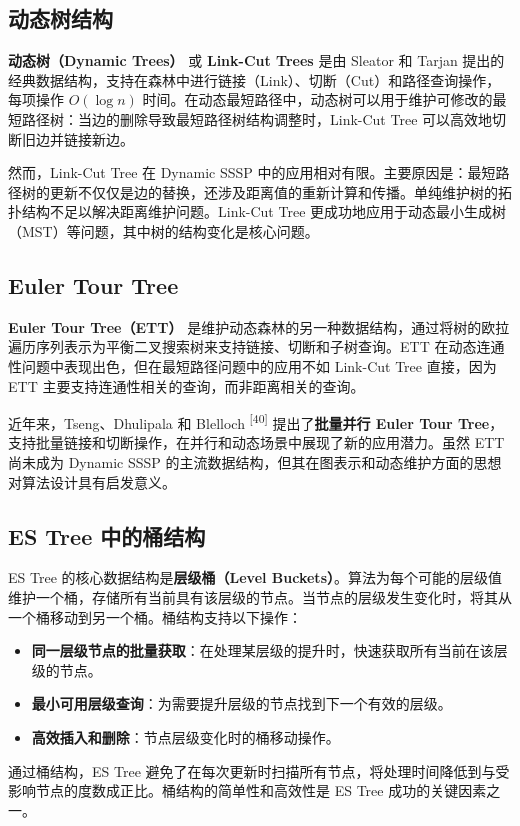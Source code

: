 \documentclass[12pt,a4paper]{ctexart}
\begin{document}
\subsection{动态树结构}

\textbf{动态树（Dynamic Trees）} 或 \textbf{Link-Cut Trees} 是由 Sleator 和 Tarjan 提出的经典数据结构，支持在森林中进行链接（Link）、切断（Cut）和路径查询操作，每项操作 $O(\log n)$ 时间。在动态最短路径中，动态树可以用于维护可修改的最短路径树：当边的删除导致最短路径树结构调整时，Link-Cut Tree 可以高效地切断旧边并链接新边。

然而，Link-Cut Tree 在 Dynamic SSSP 中的应用相对有限。主要原因是：最短路径树的更新不仅仅是边的替换，还涉及距离值的重新计算和传播。单纯维护树的拓扑结构不足以解决距离维护问题。Link-Cut Tree 更成功地应用于动态最小生成树（MST）等问题，其中树的结构变化是核心问题。

\subsection{Euler Tour Tree}

\textbf{Euler Tour Tree（ETT）} 是维护动态森林的另一种数据结构，通过将树的欧拉遍历序列表示为平衡二叉搜索树来支持链接、切断和子树查询。ETT 在动态连通性问题中表现出色，但在最短路径问题中的应用不如 Link-Cut Tree 直接，因为 ETT 主要支持连通性相关的查询，而非距离相关的查询。

近年来，Tseng、Dhulipala 和 Blelloch \textsuperscript{[40]}  提出了\textbf{批量并行 Euler Tour Tree}，支持批量链接和切断操作，在并行和动态场景中展现了新的应用潜力。虽然 ETT 尚未成为 Dynamic SSSP 的主流数据结构，但其在图表示和动态维护方面的思想对算法设计具有启发意义。

\subsection{ES Tree 中的桶结构}

ES Tree 的核心数据结构是\textbf{层级桶（Level Buckets）}。算法为每个可能的层级值维护一个桶，存储所有当前具有该层级的节点。当节点的层级发生变化时，将其从一个桶移动到另一个桶。桶结构支持以下操作：

\begin{itemize}
\item \textbf{同一层级节点的批量获取}：在处理某层级的提升时，快速获取所有当前在该层级的节点。
\item \textbf{最小可用层级查询}：为需要提升层级的节点找到下一个有效的层级。
\item \textbf{高效插入和删除}：节点层级变化时的桶移动操作。

\end{itemize}
通过桶结构，ES Tree 避免了在每次更新时扫描所有节点，将处理时间降低到与受影响节点的度数成正比。桶结构的简单性和高效性是 ES Tree 成功的关键因素之一。
\end{document}
